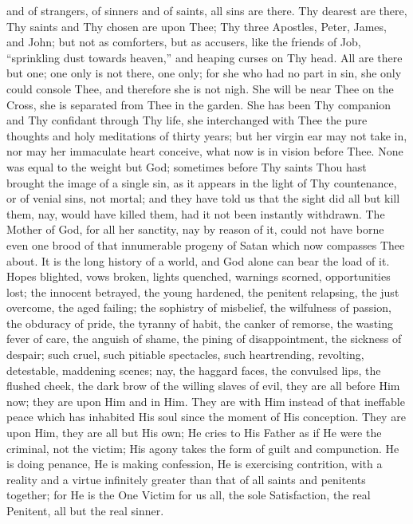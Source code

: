 and of strangers, of sinners and of saints, all sins are there. Thy
dearest are there, Thy saints and Thy chosen are upon Thee; Thy three
Apostles, Peter, James, and John; but not as comforters, but as
accusers, like the friends of Job, ``sprinkling dust towards
heaven,'' and heaping curses on Thy head. All are there but one;
one only is not there, one only; for she who had no part in sin, she
only could console Thee, and therefore she is not nigh. She will be
near Thee on the Cross, she is separated from Thee in the garden. She
has been Thy companion and Thy confidant through Thy life, she
interchanged with Thee the pure thoughts and holy meditations of
thirty years; but her virgin ear may not take in, nor may her
immaculate heart conceive, what now is in vision before Thee. None was
equal to the weight but God; sometimes before Thy saints Thou hast
brought the image of a single sin, as it appears in the light of Thy
countenance, or of venial sins, not mortal; and they have told us that
the sight did all but kill them, nay, would have killed them, had it
not been instantly withdrawn. The Mother of God, for all her sanctity,
nay by reason of it, could not have borne even one brood of that
innumerable progeny of Satan which now compasses Thee about. It is the
long history of a world, and God alone can bear the load of it. Hopes
blighted, vows broken, lights quenched, warnings scorned,
opportunities lost; the innocent betrayed, the young hardened, the
penitent relapsing, the just overcome, the aged failing; the sophistry
of misbelief, the wilfulness of passion, the obduracy of pride, the
tyranny of habit, the canker of remorse, the wasting fever of care,
the anguish of shame, the pining of disappointment, the sickness of
despair; such cruel, such pitiable spectacles, such heartrending,
revolting, detestable, maddening scenes; nay, the haggard faces, the
convulsed lips, the flushed cheek, the dark brow of the willing slaves
of evil, they are all before Him now; they are upon Him and in Him.
They are with Him instead of that ineffable peace which has inhabited
His soul since the moment of His conception. They are upon Him, they
are all but His own; He cries to His Father as if He were the
criminal, not the victim; His agony takes the form of guilt and
compunction. He is doing penance, He is making confession, He is
exercising contrition, with a reality and a virtue infinitely greater
than that of all saints and penitents together; for He is the One
Victim for us all, the sole Satisfaction, the real Penitent, all but
the real sinner.

